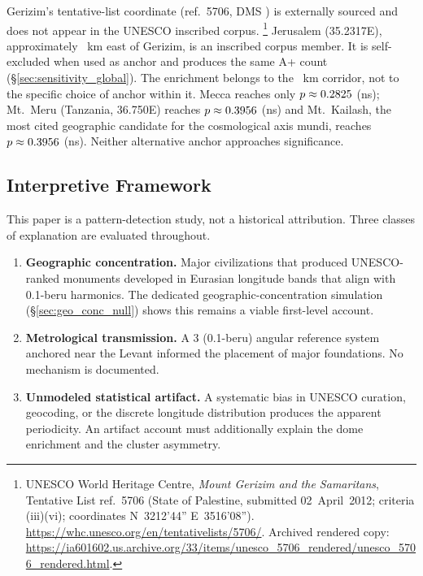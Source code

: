 \documentclass[12pt,a4paper]{article}
\begin{document}
Gerizim's tentative-list coordinate (ref.~5706, DMS \GerizimLonDMS{}) is
externally sourced and does not appear in the UNESCO inscribed corpus.%
\footnote{UNESCO World Heritage Centre, \textit{Mount Gerizim and the
Samaritans}, Tentative List ref.~5706 (State of Palestine, submitted
02~April~2012; criteria (iii)(vi); coordinates N~32\textdegree{}12'44''
E~35\textdegree{}16'08''). \url{https://whc.unesco.org/en/tentativelists/5706/}.
Archived rendered copy:
\url{https://ia601602.us.archive.org/33/items/unesco_5706_rendered/unesco_5706_rendered.html}.}
Jerusalem (35.2317\textdegree{}E), approximately \GerizimJerusalemKm~km east
of Gerizim, is an inscribed corpus member. It is self-excluded when used as
anchor and produces the same A+ count (\S\ref{sec:sensitivity_global}).
The enrichment belongs to the \GerizimJerusalemKm~km corridor, not to the
specific choice of anchor within it.
Mecca reaches only $p \approx 0.2825$ (ns);
Mt.\ Meru (Tanzania, 36.750\textdegree{}E) reaches $p \approx 0.3956$ (ns)
and Mt.\ Kailash, the most cited geographic candidate for the cosmological
axis mundi, reaches $p \approx 0.3956$ (ns).
Neither alternative anchor approaches significance.

\subsection{Interpretive Framework}
\label{sec:framework}

This paper is a pattern-detection study, not a historical attribution.
Three classes of explanation are evaluated throughout.

\begin{enumerate}
\item \textbf{Geographic concentration.}
Major civilizations that produced UNESCO-ranked monuments developed in
Eurasian longitude bands that align with 0.1-beru harmonics.
The dedicated geographic-concentration simulation (\S\ref{sec:geo_conc_null})
shows this remains a viable first-level account.

\item \textbf{Metrological transmission.}
A 3\textdegree{} (0.1-beru) angular reference system anchored near the Levant
informed the placement of major foundations. No mechanism is documented.

\item \textbf{Unmodeled statistical artifact.}
A systematic bias in UNESCO curation, geocoding, or the discrete longitude
distribution produces the apparent periodicity. An artifact account must
additionally explain the dome enrichment and the cluster asymmetry.
\end{enumerate}
\end{document}
